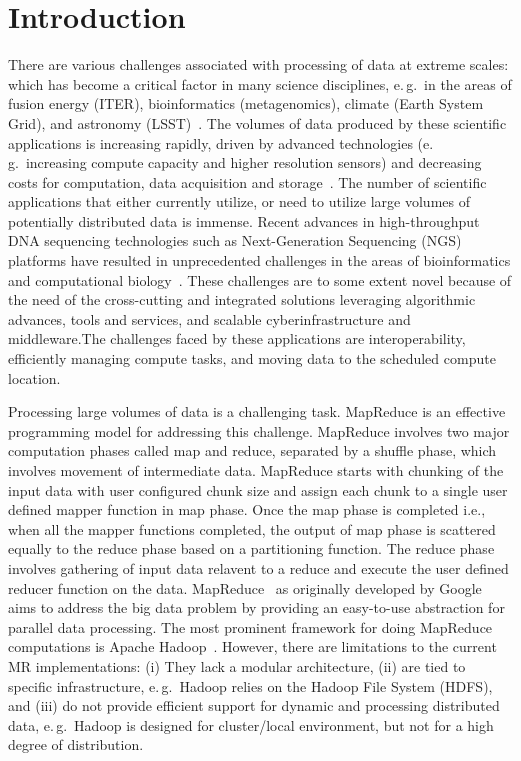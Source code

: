 \documentclass[12pt]{report}
\begin{document}
\chapter{Introduction} 

There are various challenges associated with processing of data at extreme scales: which has become a critical factor in many science
disciplines, e.\,g.\ in the areas of fusion energy (ITER), bioinformatics (metagenomics), climate (Earth System Grid), and astronomy
(LSST)~\cite{Berriman:2011:AAS:2039359.2047483,Jha:2011fk}. The volumes of data produced by these scientific applications is
increasing rapidly, driven by advanced technologies (e.\,g.\ increasing compute capacity and higher resolution sensors) and
decreasing costs for computation, data acquisition and storage~\cite{hey2009}. The number of scientific applications that
either currently utilize, or need to utilize large volumes of potentially distributed data is immense. Recent advances in high-throughput 
DNA sequencing technologies such as  Next-Generation Sequencing (NGS) platforms have resulted in unprecedented challenges 
in the areas of bioinformatics and computational biology~\cite{metzker2010,1000genome,wang2009-natrevgen,alex2009,mcpherson2009}. 
These challenges are to some extent novel because of the need of the cross-cutting and integrated solutions leveraging algorithmic
advances, tools and services, and scalable cyberinfrastructure and middleware.The challenges faced by these
applications are interoperability, efficiently managing compute tasks, and moving data to the scheduled compute location.


Processing large volumes of data is a challenging task. MapReduce is an effective programming model for addressing this challenge. MapReduce involves two 
major computation phases called map and reduce, separated by a shuffle phase, which involves movement of intermediate data. 
MapReduce starts with chunking of the input data with user configured chunk size and assign each chunk to a single user defined mapper function in map phase. Once the map phase is completed i.e., when all the mapper functions completed, the output of map phase is scattered equally to the reduce phase based on a partitioning function. The reduce phase involves gathering of input data relavent to a reduce and execute the user defined reducer function on the data. MapReduce~\cite{Dean:2004:MSD:1251254.1251264} as originally developed by Google aims to address the big data problem by providing an
easy-to-use abstraction for parallel data processing. The most prominent framework for doing MapReduce computations is Apache
Hadoop~\cite{hadoop}. However, there are limitations to the current MR implementations: (i) They lack a modular architecture, (ii) are
tied to specific infrastructure, e.\,g.\ Hadoop relies on the Hadoop File System (HDFS), and (iii) do not provide efficient support for
dynamic and processing distributed data, e.\,g.\ Hadoop is designed for cluster/local environment, but not for a high degree of
distribution.
\end{document}
